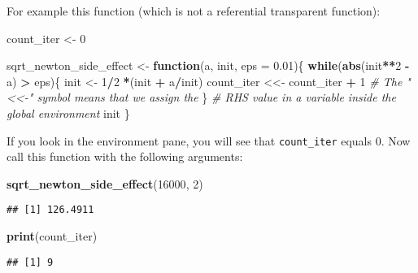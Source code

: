 \documentclass[
]{article}
\newenvironment{Shaded}{\begin{snugshade}}{\end{snugshade}}
\newcommand{\CommentTok}[1]{\textcolor[rgb]{0.56,0.35,0.01}{\textit{#1}}}
\newcommand{\ControlFlowTok}[1]{\textcolor[rgb]{0.13,0.29,0.53}{\textbf{#1}}}
\newcommand{\DataTypeTok}[1]{\textcolor[rgb]{0.13,0.29,0.53}{#1}}
\newcommand{\DecValTok}[1]{\textcolor[rgb]{0.00,0.00,0.81}{#1}}
\newcommand{\FloatTok}[1]{\textcolor[rgb]{0.00,0.00,0.81}{#1}}
\newcommand{\KeywordTok}[1]{\textcolor[rgb]{0.13,0.29,0.53}{\textbf{#1}}}
\newcommand{\NormalTok}[1]{#1}
\newcommand{\OperatorTok}[1]{\textcolor[rgb]{0.81,0.36,0.00}{\textbf{#1}}}
\newcommand{\StringTok}[1]{\textcolor[rgb]{0.31,0.60,0.02}{#1}}
\begin{document}
For example this function (which is not a referential transparent function):

\begin{Shaded}
\begin{Highlighting}[]
\NormalTok{count\_iter \textless{}{-}}\StringTok{ }\DecValTok{0}

\NormalTok{sqrt\_newton\_side\_effect \textless{}{-}}\StringTok{ }\ControlFlowTok{function}\NormalTok{(a, init, }\DataTypeTok{eps =} \FloatTok{0.01}\NormalTok{)\{}
    \ControlFlowTok{while}\NormalTok{(}\KeywordTok{abs}\NormalTok{(init}\OperatorTok{**}\DecValTok{2} \OperatorTok{{-}}\StringTok{ }\NormalTok{a) }\OperatorTok{\textgreater{}}\StringTok{ }\NormalTok{eps)\{}
\NormalTok{        init \textless{}{-}}\StringTok{ }\DecValTok{1}\OperatorTok{/}\DecValTok{2} \OperatorTok{*}\NormalTok{(init }\OperatorTok{+}\StringTok{ }\NormalTok{a}\OperatorTok{/}\NormalTok{init)}
\NormalTok{        count\_iter \textless{}\textless{}{-}}\StringTok{ }\NormalTok{count\_iter }\OperatorTok{+}\StringTok{ }\DecValTok{1} \CommentTok{\# The "\textless{}\textless{}{-}" symbol means that we assign the}
\NormalTok{    \}                                 }\CommentTok{\# RHS value in a variable inside the global environment}
\NormalTok{    init}
\NormalTok{\}}
\end{Highlighting}
\end{Shaded}

If you look in the environment pane, you will see that \texttt{count\_iter} equals 0. Now call this
function with the following arguments:

\begin{Shaded}
\begin{Highlighting}[]
\KeywordTok{sqrt\_newton\_side\_effect}\NormalTok{(}\DecValTok{16000}\NormalTok{, }\DecValTok{2}\NormalTok{)}
\end{Highlighting}
\end{Shaded}

\begin{verbatim}
## [1] 126.4911
\end{verbatim}

\begin{Shaded}
\begin{Highlighting}[]
\KeywordTok{print}\NormalTok{(count\_iter)}
\end{Highlighting}
\end{Shaded}

\begin{verbatim}
## [1] 9
\end{verbatim}
\end{document}
